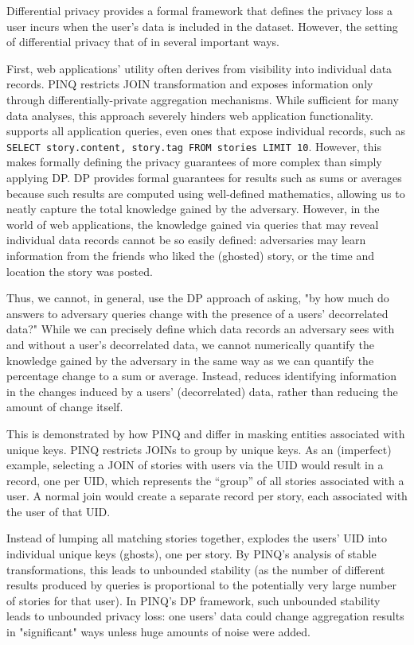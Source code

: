Differential privacy provides a formal framework that defines the privacy loss a user incurs
when the user's data is included in the dataset. However, the setting of differential privacy
that of \sys{} in several important ways. 

First, web applications' utility often derives from visibility into individual data records. PINQ
restricts JOIN transformation and exposes information only through differentially-private
aggregation mechanisms. While sufficient for many data analyses, this approach severely hinders web
application functionality. \sys{} supports all application queries, even ones that expose individual
records, such as \texttt{SELECT story.content, story.tag FROM stories LIMIT 10}.  
However, this makes formally defining the privacy guarantees of \sys{} more complex than
simply applying DP.  DP provides formal guarantees for results such as sums or averages because such
results are computed using well-defined mathematics, allowing us to neatly capture the total
knowledge gained by the adversary. However, in the world of web applications, the knowledge gained
via queries that may reveal individual data records cannot be so easily defined: adversaries may
learn information from the friends who liked the (ghosted) story, or the time and location the story
was posted.

Thus, we cannot, in general, use the DP approach of asking, "by how much do answers to adversary
queries change with the presence of a users' decorrelated data?" While we can precisely define which
data records an adversary sees with and without a user's decorrelated data, we cannot numerically
quantify the knowledge gained by the adversary in the same way as we can quantify the percentage
change to a sum or average.
Instead, \sys{} reduces identifying information in the changes induced by a users' (decorrelated)
data, rather than reducing the amount of change itself.

This is demonstrated by how PINQ and \sys{} differ in masking entities associated with unique keys.
PINQ restricts JOINs to group by unique keys. As an (imperfect) example, selecting a JOIN of stories
with users via the UID would result in a record, one per UID, which represents the ``group'' of all
stories associated with a user. A normal join would create a separate record per story, each
associated with the user of that UID.

Instead of lumping all matching stories together, \sys{} explodes the users' UID into individual
unique keys (ghosts), one per story. By PINQ's analysis of stable transformations, this leads to
unbounded stability (as the number of different results produced by queries is proportional to the
potentially very large number of stories for that user). In PINQ's DP framework, such unbounded
stability leads to unbounded privacy loss: one users' data could change aggregation results in
"significant" ways unless huge amounts of noise were added. 

